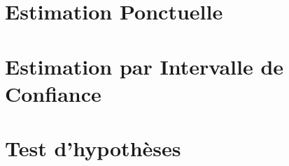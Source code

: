 \chapter{Estimation Ponctuelle}


\chapter{Estimation par Intervalle de Confiance}


\chapter{Test d'hypothèses}
